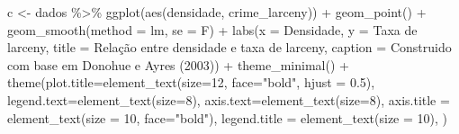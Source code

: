 \documentclass[
]{article}
\newenvironment{Shaded}{\begin{snugshade}}{\end{snugshade}}
\newcommand{\AttributeTok}[1]{\textcolor[rgb]{0.77,0.63,0.00}{#1}}
\newcommand{\DecValTok}[1]{\textcolor[rgb]{0.00,0.00,0.81}{#1}}
\newcommand{\FloatTok}[1]{\textcolor[rgb]{0.00,0.00,0.81}{#1}}
\newcommand{\FunctionTok}[1]{\textcolor[rgb]{0.00,0.00,0.00}{#1}}
\newcommand{\NormalTok}[1]{#1}
\newcommand{\OtherTok}[1]{\textcolor[rgb]{0.56,0.35,0.01}{#1}}
\newcommand{\SpecialCharTok}[1]{\textcolor[rgb]{0.00,0.00,0.00}{#1}}
\newcommand{\StringTok}[1]{\textcolor[rgb]{0.31,0.60,0.02}{#1}}
\begin{document}
\begin{Shaded}
\begin{Highlighting}[]
\NormalTok{c }\OtherTok{\textless{}{-}}\NormalTok{ dados }\SpecialCharTok{\%\textgreater{}\%} 
  \FunctionTok{ggplot}\NormalTok{(}\FunctionTok{aes}\NormalTok{(densidade, crime\_larceny)) }\SpecialCharTok{+}
  \FunctionTok{geom\_point}\NormalTok{() }\SpecialCharTok{+} 
  \FunctionTok{geom\_smooth}\NormalTok{(}\AttributeTok{method =} \StringTok{\textquotesingle{}lm\textquotesingle{}}\NormalTok{, }\AttributeTok{se =}\NormalTok{ F) }\SpecialCharTok{+}
  \FunctionTok{labs}\NormalTok{(}\AttributeTok{x =} \StringTok{\textquotesingle{}Densidade\textquotesingle{}}\NormalTok{,}
       \AttributeTok{y =} \StringTok{\textquotesingle{}Taxa de larceny\textquotesingle{}}\NormalTok{,}
       \AttributeTok{title =} \StringTok{\textquotesingle{}Relação entre densidade e taxa de larceny\textquotesingle{}}\NormalTok{,}
       \AttributeTok{caption =} \StringTok{\textquotesingle{}Construido com base em Donohue e Ayres (2003)\textquotesingle{}}\NormalTok{) }\SpecialCharTok{+} 
  \FunctionTok{theme\_minimal}\NormalTok{() }\SpecialCharTok{+}
  \FunctionTok{theme}\NormalTok{(}\AttributeTok{plot.title=}\FunctionTok{element\_text}\NormalTok{(}\AttributeTok{size=}\DecValTok{12}\NormalTok{, }\AttributeTok{face=}\StringTok{"bold"}\NormalTok{, }\AttributeTok{hjust =} \FloatTok{0.5}\NormalTok{),}
        \AttributeTok{legend.text=}\FunctionTok{element\_text}\NormalTok{(}\AttributeTok{size=}\DecValTok{8}\NormalTok{),}
        \AttributeTok{axis.text=}\FunctionTok{element\_text}\NormalTok{(}\AttributeTok{size=}\DecValTok{8}\NormalTok{),}
        \AttributeTok{axis.title =} \FunctionTok{element\_text}\NormalTok{(}\AttributeTok{size =} \DecValTok{10}\NormalTok{, }\AttributeTok{face=}\StringTok{"bold"}\NormalTok{),}
        \AttributeTok{legend.title =} \FunctionTok{element\_text}\NormalTok{(}\AttributeTok{size =} \DecValTok{10}\NormalTok{),}
\NormalTok{        )}


\end{Highlighting}
\end{Shaded}
\end{document}
